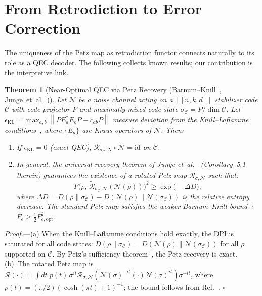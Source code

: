 \documentclass[prl,twocolumn,superscriptaddress,longbibliography,floatfix]{revtex4-2}
\newtheorem{theorem}{Theorem}
\newcommand{\id}{\mathrm{id}}
\newcommand{\Petz}{\mathcal{R}}
\newcommand{\chan}{\mathcal{N}}
\newcommand{\code}{\mathcal{C}}
\newcommand{\norm}[1]{\left\|#1\right\|}
\begin{document}
\section{From Retrodiction to Error Correction}
\label{sec:qec}

The uniqueness of the Petz map as retrodiction functor connects
naturally to its role as a QEC decoder.  The following collects
known results; our contribution is the interpretive link.

\begin{theorem}[Near-Optimal QEC via Petz Recovery
  (Barnum--Knill~\cite{Barnum2002},
   Junge~et~al.~\cite{Junge2018})]
\label{thm:qec}
Let $\chan$ be a noise channel acting on a $[\![n,k,d]\!]$ stabilizer
code $\code$ with code projector $P$ and maximally mixed code state
$\sigma_{\code} = P/\dim\code$. Let
$\epsilon_{\mathrm{KL}} = \max_{a,b}\norm{P E_a^\dagger E_b P
- c_{ab} P}$ measure deviation from the Knill--Laflamme
conditions~\cite{KnillLaflamme1997}, where $\{E_a\}$ are Kraus operators
of $\chan$. Then:
\begin{enumerate}
\item[\emph{(a)}] If $\epsilon_{\mathrm{KL}} = 0$ (exact QEC),
  $\Petz_{\sigma_{\code},\chan} \circ \chan = \id$ on $\code$.
\item[\emph{(b)}] In general, the universal recovery theorem
  of Junge et~al.~\cite{Junge2018} (Corollary~5.1 therein)
  guarantees the existence of a \emph{rotated} Petz map
  $\tilde{\Petz}_{\sigma,\chan}$ such that:
  \begin{equation}
  F\big(\rho,\,\tilde{\Petz}_{\sigma_{\code},\chan}(\chan(\rho))\big)^2
  \geq \exp\!\big(-\Delta D\big),
  \label{eq:recovery_bound}
  \end{equation}
  where $\Delta D = D(\rho\|\sigma_\code) -
  D(\chan(\rho)\|\chan(\sigma_\code))$ is the relative entropy
  decrease.  The standard Petz map satisfies the weaker
  Barnum--Knill bound~\cite{Barnum2002}:
  $F_e \geq \frac{1}{2}F_{e,\mathrm{opt}}^2$.
\end{enumerate}
\end{theorem}

\emph{Proof.}---(a) When the Knill--Laflamme conditions hold exactly,
the DPI is saturated for all code states: $D(\rho\|\sigma_\code) =
D(\chan(\rho)\|\chan(\sigma_\code))$ for all $\rho$ supported on
$\code$. By Petz's sufficiency theorem~\cite{Petz1988}, the Petz
recovery is exact. (b)~The rotated Petz map is
$\tilde{\Petz}(\cdot) = \int\!dt\;p(t)\,\sigma^{it}
\Petz_{\sigma,\chan}(\chan(\sigma)^{-it}(\cdot)
\chan(\sigma)^{it})\sigma^{-it}$,
where $p(t) = (\pi/2)(\cosh(\pi t)+1)^{-1}$; the bound follows
from Ref.~\cite{Junge2018}. \hfill$\square$
\end{document}
